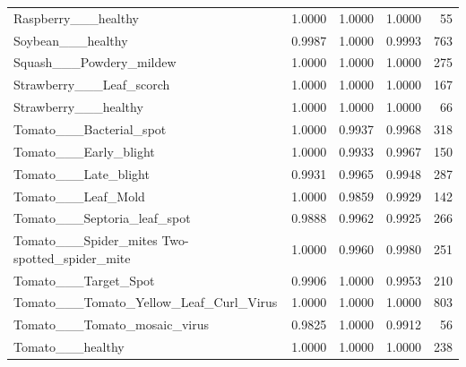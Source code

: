 \begin{tabular}{lrrrr}
Raspberry\_\_\_healthy & 1.0000 & 1.0000 & 1.0000 & 55 \\
Soybean\_\_\_healthy & 0.9987 & 1.0000 & 0.9993 & 763 \\
Squash\_\_\_Powdery\_mildew & 1.0000 & 1.0000 & 1.0000 & 275 \\
Strawberry\_\_\_Leaf\_scorch & 1.0000 & 1.0000 & 1.0000 & 167 \\
Strawberry\_\_\_healthy & 1.0000 & 1.0000 & 1.0000 & 66 \\
Tomato\_\_\_Bacterial\_spot & 1.0000 & 0.9937 & 0.9968 & 318 \\
Tomato\_\_\_Early\_blight & 1.0000 & 0.9933 & 0.9967 & 150 \\
Tomato\_\_\_Late\_blight & 0.9931 & 0.9965 & 0.9948 & 287 \\
Tomato\_\_\_Leaf\_Mold & 1.0000 & 0.9859 & 0.9929 & 142 \\
Tomato\_\_\_Septoria\_leaf\_spot & 0.9888 & 0.9962 & 0.9925 & 266 \\
Tomato\_\_\_Spider\_mites Two-spotted\_spider\_mite & 1.0000 & 0.9960 & 0.9980 & 251 \\
Tomato\_\_\_Target\_Spot & 0.9906 & 1.0000 & 0.9953 & 210 \\
Tomato\_\_\_Tomato\_Yellow\_Leaf\_Curl\_Virus & 1.0000 & 1.0000 & 1.0000 & 803 \\
Tomato\_\_\_Tomato\_mosaic\_virus & 0.9825 & 1.0000 & 0.9912 & 56 \\
Tomato\_\_\_healthy & 1.0000 & 1.0000 & 1.0000 & 238 \\
\bottomrule
\end{tabular}
